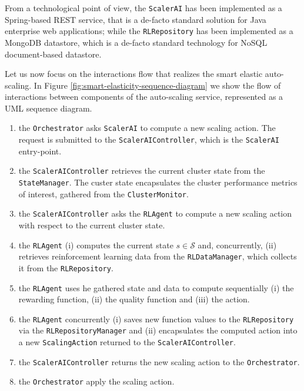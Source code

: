 From a technological point of view, the \texttt{ScalerAI} has been implemented as a Spring-based REST service, that is a de-facto standard solution for Java enterprise web applications; while the \texttt{RLRepository} has been implemented as a MongoDB datastore, which is a de-facto standard technology for NoSQL document-based datastore. 

Let us now focus on the interactions flow that realizes the smart elastic auto-scaling.
%
In Figure \ref{fig:smart-elasticity-sequence-diagram} we show the flow of interactions between components of the auto-scaling service, represented as a UML sequence diagram.

\begin{enumerate}
	
	\item the \texttt{Orchestrator} asks \texttt{ScalerAI} to compute a new scaling action. The request is submitted to the \texttt{ScalerAIController}, which is the \texttt{ScalerAI} entry-point.
	
	\item the \texttt{ScalerAIController} retrieves the current cluster state from the \texttt{StateManager}. The custer state encapsulates the cluster performance metrics of interest, gathered from the \texttt{ClusterMonitor}.
	
	\item the \texttt{ScalerAIController} asks the \texttt{RLAgent} to compute a new scaling action with respect to the current cluster state.
	
	\item the \texttt{RLAgent} (i) computes the current state $s\in\mathcal{S}$ and, concurrently, (ii) retrieves reinforcement learning data from the \texttt{RLDataManager}, which collects it from the \texttt{RLRepository}.
	
	\item the \texttt{RLAgent} uses he gathered state and data to compute sequentially (i) the rewarding function, (ii) the quality function and (iii) the action.
	
	\item the \texttt{RLAgent} concurrently (i) saves new function values to the \texttt{RLRepository} via the \texttt{RLRepositoryManager} and (ii) encapsulates the computed action into a new \texttt{ScalingAction} returned to the \texttt{ScalerAIController}.
	
	\item the \texttt{ScalerAIController} returns the new scaling action to the \texttt{Orchestrator}.
	
	\item the \texttt{Orchestrator} apply the scaling action.
	
\end{enumerate}

